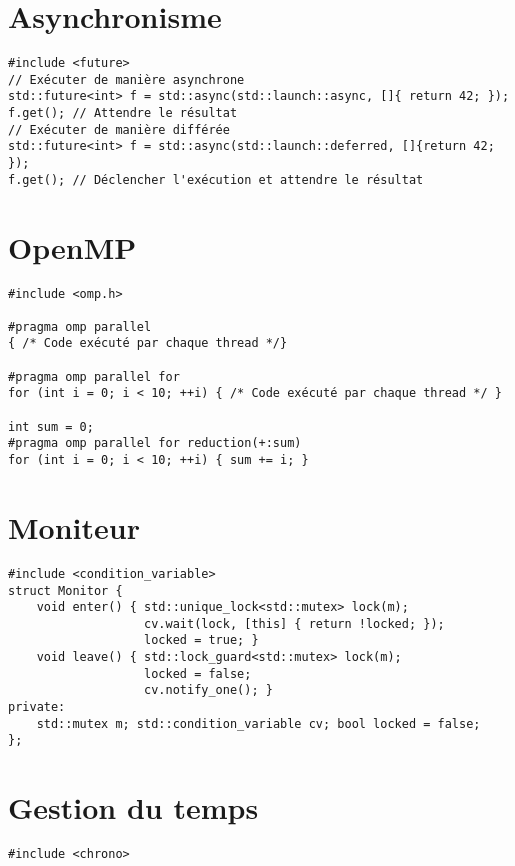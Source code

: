 \documentclass{article}
\begin{document}
\begin{multicols*}{3}
\section*{Asynchronisme}

\begin{lstlisting}
#include <future>
// Exécuter de manière asynchrone
std::future<int> f = std::async(std::launch::async, []{ return 42; });
f.get(); // Attendre le résultat
// Exécuter de manière différée
std::future<int> f = std::async(std::launch::deferred, []{return 42; });
f.get(); // Déclencher l'exécution et attendre le résultat
\end{lstlisting}

\section*{OpenMP}

\begin{lstlisting}
#include <omp.h>

#pragma omp parallel
{ /* Code exécuté par chaque thread */}

#pragma omp parallel for
for (int i = 0; i < 10; ++i) { /* Code exécuté par chaque thread */ }

int sum = 0;
#pragma omp parallel for reduction(+:sum)
for (int i = 0; i < 10; ++i) { sum += i; }
\end{lstlisting}

\section*{Moniteur}

\begin{lstlisting}
#include <condition_variable>
struct Monitor {
    void enter() { std::unique_lock<std::mutex> lock(m);
                   cv.wait(lock, [this] { return !locked; });
                   locked = true; }
    void leave() { std::lock_guard<std::mutex> lock(m);
                   locked = false;
                   cv.notify_one(); }
private:
    std::mutex m; std::condition_variable cv; bool locked = false;
};
\end{lstlisting}

\section*{Gestion du temps}

\begin{lstlisting}
#include <chrono>


\end{lstlisting}
\end{multicols*}
\end{document}
